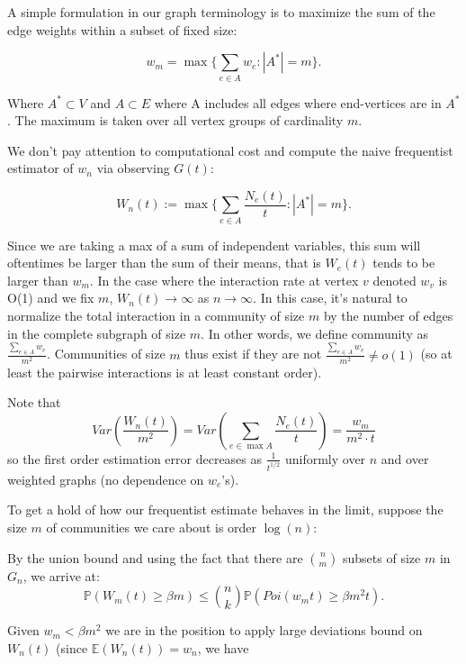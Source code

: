  A simple formulation in our graph terminology is to maximize the sum of the edge weights within a subset of fixed size:
 
\begin{equation}
w_m = \max\{\sum_{e \in A} w_e : |A^*|=m\}.
\end{equation} 
 
 Where $A^* \subset V$ and $A \subset E$ where A includes all edges where end-vertices are in $A^*$.  The maximum is taken over all vertex groups of cardinality $m$.  

We don't pay attention to computational cost and compute the naive frequentist estimator of $w_n$ via observing $G(t)$:

\begin{equation}
W_n(t) := \max\{ \sum_{e \in A} \frac{N_e(t)}{t} : |A^*| = m\}.
\end{equation} 

Since we are taking a max of a sum of independent variables, this sum will oftentimes be larger than the sum of their means, that is $W_e(t)$ tends to be larger than $w_m$.  In the case where the interaction rate at vertex $v$ denoted $w_v$ is O(1) and we fix $m$, $W_n(t) \rightarrow \infty $ as $n \rightarrow \infty$.  In this case, it's natural to normalize the total interaction in a community of size $m$ by the number of edges in the complete subgraph of size $m$.  In other words, we define community as $\frac{\sum_{e \in A} w_e}{m^2}$.  Communities of size $m$ thus exist if they are not $\frac{\sum_{e \in A} w_e}{m^2} \neq o(1)$ (so at least the pairwise interactions is at least constant order).  


 Note that $$Var (\frac{W_n(t)}{m^2}) = Var (\sum_{e \in \max A} \frac{N_e(t)}{t}) = \frac{w_m}{m^2\cdot t}$$ so the first order estimation error decreases as $\frac{1}{t^{1/2}}$ uniformly over $n$ and over weighted graphs (no dependence on $w_e$'s).

To get a hold of how our frequentist estimate behaves in the limit, suppose the size $m$ of communities we care about is order $\log(n)$:

By the union bound and using the fact that there are ${n \choose m}$ subsets of size $m$ in $G_n$, we arrive at:
\begin{equation}
\mathbb{P}(W_m(t) \geq \beta m) \leq {n \choose k} \mathbb{P}(Poi(w_m t) \geq \beta m^2 t).
\end{equation}


Given $w_m < \beta m^2$ we are in the position to apply large deviations bound  on $W_n(t)$ (since $\mathbb{E}(W_n(t)) = w_n$, we have

